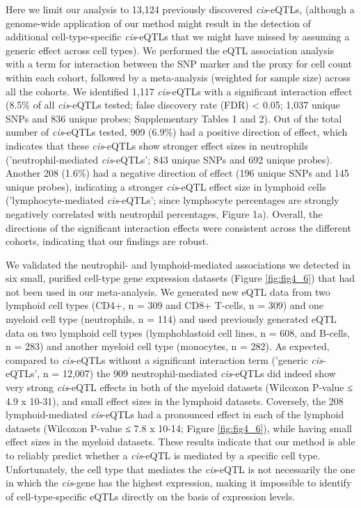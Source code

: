   Here we limit our analysis to 13,124 previously discovered \emph{cis}-eQTLs\cite{Westra:2013}, (although a genome-wide application of our method 
  might result in the detection of additional cell-type-specific \emph{cis}-eQTLs that we might have missed by assuming a generic 
  effect across cell types). We performed the eQTL association analysis with a term for interaction between the SNP marker 
  and the proxy for cell count within each cohort, followed by a meta-analysis (weighted for sample size) across all the 
  cohorts. We identified 1,117 \emph{cis}-eQTLs with a significant interaction effect (8.5\% of all \emph{cis}-eQTLs tested; false discovery 
  rate (FDR) < 0.05; 1,037 unique SNPs and 836 unique probes; Supplementary Tables 1 and 2). Out of the total number of \emph{cis}-eQTLs 
  tested, 909 (6.9\%) had a positive direction of effect, which indicates that these \emph{cis}-eQTLs show stronger effect sizes in 
  neutrophils ('neutrophil-mediated \emph{cis}-eQTLs'; 843 unique SNPs and 692 unique probes). Another 208 (1.6\%) had a negative direction 
  of effect (196 unique SNPs and 145 unique probes), indicating a stronger \emph{cis}-eQTL effect size in lymphoid cells ('lymphocyte-mediated 
  \emph{cis}-eQTLs'; since lymphocyte percentages are strongly negatively correlated with neutrophil percentages, Figure 1a). Overall, 
  the directions of the significant interaction effects were consistent across the different cohorts, indicating that our findings 
  are robust.

  We validated the neutrophil- and lymphoid-mediated associations we detected in six small, purified cell-type gene expression datasets (Figure \ref{fig:fig4_6}) 
  that had not been used in our meta-analysis. We generated new eQTL data from two lymphoid cell types (CD4+, n = 309 and CD8+ T-cells,
  n = 309) and one myeloid cell type (neutrophils, n = 114) and used previously generated eQTL data on two lymphoid 
  cell types (lymphoblastoid cell lines, n = 608, and B-cells, n = 283) and another myeloid cell type (monocytes, n = 282). As expected, 
  compared to \emph{cis}-eQTLs without a significant interaction term ('generic \emph{cis}-eQTLs', n = 12,007) the 909 neutrophil-mediated \emph{cis}-eQTLs did 
  indeed show very strong \emph{cis}-eQTL effects in both of the myeloid datasets (Wilcoxon P-value ≤ 4.9 x 10-31), 
  and small effect sizes in the lymphoid datasets. Coversely, the 208 lymphoid-mediated \emph{cis}-eQTLs had a pronounced effect in each of the 
  lymphoid datasets (Wilcoxon P-value ≤ 7.8 x 10-14; Figure \ref{fig:fig4_6}), while having small effect sizes in the myeloid datasets. These results 
  indicate that our method is able to reliably predict whether a \emph{cis}-eQTL is mediated by a specific cell type. Unfortunately, the cell 
  type that mediates the \emph{cis}-eQTL is not necessarily the one in which the \emph{cis}-gene has the highest expression, making it impossible to identify 
  of cell-type-specific eQTLs directly on the basis of expression levels.

